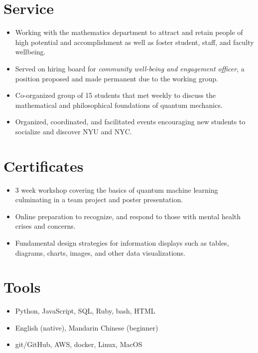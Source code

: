 \documentclass{cultvoucher}
\begin{document}
\section{Service}

\begin{itemize}
	\item Working with the mathematics department to attract and retain people of high potential and accomplishment as well as foster student, staff, and faculty wellbeing.
	\item Served on hiring board for \emph{community well-being and engagement officer}, a position proposed and made permanent due to the working group.
\end{itemize}

\begin{itemize}
	\item Co-organized group of 15 students that met weekly to discuss the mathematical and philosophical foundations of quantum mechanics.
\end{itemize}

\begin{itemize}
	\item Organized, coordinated, and facilitated events encouraging new students to socialize and discover NYU and NYC.
\end{itemize}

\section{Certificates}
\begin{itemize}
	\item 3 week workshop covering the basics of quantum machine learning culminating in a team project and poster presentation.
\end{itemize}
\begin{itemize}
	\item Online preparation to recognize, and respond to those with mental health crises and concerns.
\end{itemize}
\begin{itemize}
	\item Fundamental design strategies for information displays such as tables, diagrams, charts, images, and other data visualizations.
\end{itemize}


\section{Tools}
\begin{itemize}
	\item Python, JavaScript, SQL, Ruby, bash, HTML
	\item English (native), Mandarin Chinese (beginner)
\end{itemize}
\begin{itemize}
	\item git/GitHub, AWS, docker, Linux, MacOS
\end{itemize}
\end{document}
